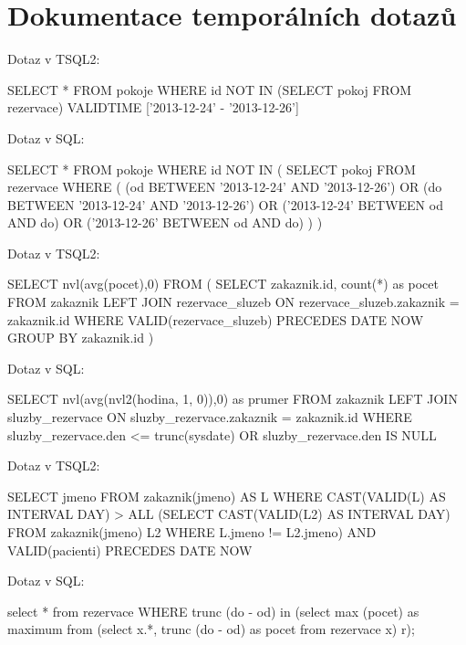 \documentclass[8pt,a4paper]{article}
\begin{document}
\section{Dokumentace temporálních dotazů}
Dotaz v TSQL2:
\begin{center}
\begin{boxedverbatim}
SELECT * FROM pokoje
WHERE id NOT IN (SELECT pokoj FROM rezervace)
VALIDTIME ['2013-12-24' - '2013-12-26']
\end{boxedverbatim}
\end{center}
Dotaz v SQL:
\begin{center}
\begin{boxedverbatim}
SELECT * FROM pokoje 
WHERE id NOT IN (
  SELECT pokoj FROM rezervace WHERE (
    (od BETWEEN '2013-12-24' AND '2013-12-26') OR
    (do BETWEEN '2013-12-24' AND '2013-12-26') OR
    ('2013-12-24' BETWEEN od AND do) OR
    ('2013-12-26' BETWEEN od AND do)
  )
)
\end{boxedverbatim}
\end{center}

Dotaz v TSQL2:
\begin{center}
\begin{boxedverbatim}
SELECT nvl(avg(pocet),0) FROM (
  SELECT zakaznik.id, count(*) as pocet 
  FROM zakaznik LEFT JOIN rezervace_sluzeb ON rezervace_sluzeb.zakaznik = zakaznik.id
  WHERE VALID(rezervace_sluzeb) PRECEDES DATE NOW
  GROUP BY zakaznik.id
)
\end{boxedverbatim}
\end{center}
Dotaz v SQL:
\begin{center}
\begin{boxedverbatim}
SELECT nvl(avg(nvl2(hodina, 1, 0)),0) as prumer
  FROM zakaznik LEFT JOIN sluzby_rezervace ON sluzby_rezervace.zakaznik = zakaznik.id
  WHERE sluzby_rezervace.den <= trunc(sysdate) OR sluzby_rezervace.den IS NULL
\end{boxedverbatim}
\end{center}

Dotaz v TSQL2:
\begin{center}
\begin{boxedverbatim}
SELECT jmeno
	FROM zakaznik(jmeno) AS L
	WHERE CAST(VALID(L) AS INTERVAL DAY) > ALL (SELECT CAST(VALID(L2) AS INTERVAL DAY)
	FROM zakaznik(jmeno) L2
	WHERE L.jmeno != L2.jmeno) AND VALID(pacienti) PRECEDES DATE NOW
\end{boxedverbatim}
\end{center}
Dotaz v SQL:
\begin{center}
\begin{boxedverbatim}
select * from rezervace WHERE trunc (do - od) in (select max (pocet) as maximum from (select x.*, trunc (do - od) as pocet from rezervace x) r);
\end{boxedverbatim}
\end{center}
\end{document}
